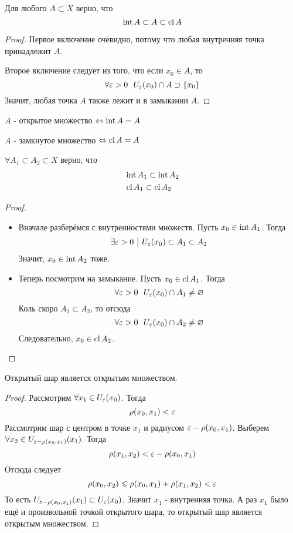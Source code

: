 \begin{lemma}
	Для любого $A \subset X$ верно, что
	\[
		\operatorname{int} A \subset A \subset \operatorname{cl} A
	\]
\end{lemma}

\begin{proof}
	Первое включение очевидно, потому что любая внутренняя точка принадлежит $A$.
	
	Второе включение следует из того, что если $x_0 \in A$, то
	\[
		\forall \varepsilon > 0\ \ U_\varepsilon(x_0) \cap A \supset \{x_0\}
	\]
	Значит, любая точка $A$ также лежит и в замыкании $A$.
\end{proof}

\begin{corollary}
	$A$ - открытое множество $\Leftrightarrow \operatorname{int} A = A$
	
	$A$ - замкнутое множество $\Leftrightarrow \operatorname{cl} A = A$ 
\end{corollary}

\begin{lemma} \label{includeLemma}
	$\forall A_1 \subset A_2 \subset X$ верно, что
	\begin{align*}
		&\operatorname{int} A_1 \subset \operatorname{int} A_2
		\\
		&\operatorname{cl} A_1 \subset \operatorname{cl} A_2
	\end{align*}
\end{lemma}

\begin{proof}~
	\begin{itemize}
		\item Вначале разберёмся с внутренностями множеств. Пусть $x_0 \in \operatorname{int} A_1$. Тогда
		\[
			\exists \varepsilon > 0 \ \big|\  U_\varepsilon(x_0) \subset A_1 \subset A_2
		\]
		Значит, $x_0 \in \operatorname{int} A_2$ тоже.
		
		\item Теперь посмотрим на замыкание. Пусть $x_0 \in \operatorname{cl} A_1$. Тогда
		\[
			\forall \varepsilon > 0\ \ U_\varepsilon(x_0) \cap A_1 \neq \varnothing
		\]
		Коль скоро $A_1 \subset A_2$, то отсюда
		\[
			\forall \eps > 0\ \ U_\eps(x_0) \cap A_2 \neq \emptyset
		\]
		Следовательно, $x_0 \in \operatorname{cl} A_2$.
	\end{itemize}
\end{proof}

\begin{lemma}
	Открытый шар является открытым множеством.
\end{lemma}

\begin{proof}
	Рассмотрим $\forall x_1 \in U_\varepsilon(x_0)$. Тогда
	\[
		\rho(x_0, x_1) < \varepsilon
	\]
	Рассмотрим шар с центром в точке $x_1$ и радиусом $\varepsilon - \rho(x_0, x_1)$. Выберем $\forall x_2 \in U_{\varepsilon - \rho(x_0, x_1)}(x_1)$. Тогда
	\[
		\rho(x_1, x_2) < \varepsilon - \rho(x_0, x_1)
	\]
	Отсюда следует
	\[
		\rho(x_0, x_2) \leqslant \rho(x_0, x_1) + \rho(x_1, x_2) < \varepsilon
	\]
	То есть $U_{\varepsilon - \rho(x_0, x_1)}(x_1) \subset U_\varepsilon(x_0)$. Значит $x_1$ - внутренняя точка. А раз $x_1$ было ещё и произвольной точкой открытого шара, то открытый шар является открытым множеством.
\end{proof}

